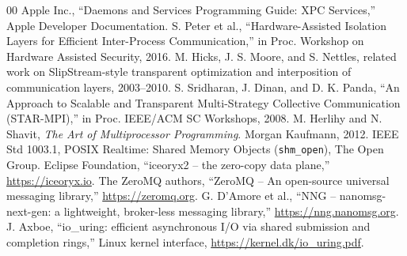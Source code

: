 \documentclass[conference]{IEEEtran}
\begin{document}
\begin{thebibliography}{00}
 Apple Inc., ``Daemons and Services Programming Guide: XPC
Services,'' Apple Developer Documentation.
 S. Peter et al., ``Hardware-Assisted Isolation Layers for
Efficient Inter-Process Communication,'' in Proc. Workshop on Hardware
Assisted Security, 2016.
 M. Hicks, J. S. Moore, and S. Nettles, related work on
SlipStream-style transparent optimization and interposition of communication
layers, 2003--2010.
 S. Sridharan, J. Dinan, and D. K. Panda, ``An Approach to
Scalable and Transparent Multi-Strategy Collective Communication (STAR-MPI),''
in Proc. IEEE/ACM SC Workshops, 2008.
 M. Herlihy and N. Shavit, \textit{The Art of Multiprocessor
Programming}. Morgan Kaufmann, 2012.
 IEEE Std 1003.1, POSIX Realtime: Shared Memory Objects
(\texttt{shm\_open}), The Open Group.
 Eclipse Foundation, ``iceoryx2 -- the zero-copy data
plane,'' \url{https://iceoryx.io}.
 The ZeroMQ authors, ``ZeroMQ -- An open-source universal
messaging library,'' \url{https://zeromq.org}.
 G. D'Amore et al., ``NNG -- nanomsg-next-gen: a lightweight,
broker-less messaging library,'' \url{https://nng.nanomsg.org}.
 J. Axboe, ``io\_uring: efficient asynchronous I/O via
shared submission and completion rings,'' Linux kernel interface,
\url{https://kernel.dk/io_uring.pdf}.
\end{thebibliography}
\end{document}
